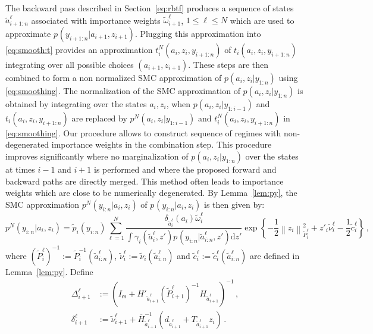 \documentclass[nolayout]{article}
\theoremstyle{plain}
\theoremstyle{definition}
\newcommand{\1}{\mathbbm{1}}
\def\rmd{\mathrm{d}}
\def\dimz{\mathsf{m}}
\def\barH{\overline{H}}
\def\eqsp{\,}
\newcommand{\normMat}[2]{\left\|#2\right\|_{#1}}
\newcommand{\eqdef}{\ensuremath{:=}}
\begin{document}
The backward pass described in Section~\ref{eq:rbtf} produces a sequence of states $\tilde{a}_{i+1:n}^{\ell}$ associated with importance weights $\tilde{\omega}_{i+1}^{\ell}$, $1\le \ell\le N$ which are used to approximate $p_{}(y_{i+1:n}|a_{i+1},z_{i+1})$. Plugging this approximation into \eqref{eq:smooth:t} provides an approximation $t^N_{i}(a_i,z_i,y_{i+1:n})$ of $t_{i}(a_i,z_i,y_{i+1:n})$ integrating over all possible choices $(a_{i+1},z_{i+1})$. These steps are then combined to form a non normalized SMC approximation of $p(a_{i},z_{i}|y_{1:n})$ using \eqref{eq:smoothing}. The normalization of the SMC approximation of $p(a_{i},z_{i}|y_{1:n})$ is obtained by integrating over the states $a_{i},z_{i}$, when $p(a_{i},z_{i}|y_{1:i-1})$ and $t_{i}(a_i,z_i,y_{i+1:n})$ are replaced by $p^N(a_{i},z_{i}|y_{1:i-1})$ and $t^N_{i}(a_i,z_i,y_{i+1:n})$ in \eqref{eq:smoothing}. 
Our procedure allows to construct sequence of regimes with non-degenerated importance weights in the combination step. This procedure improves significantly \cite{briers:doucet:maskell:2010} where no marginalization of $p(a_{i},z_{i}|y_{1:n})$ over the states at times $i-1$ and $i+1$ is performed and where the proposed forward and backward paths are directly merged. This method often leads to importance weights which are close to be numerically degenerated. By Lemma~\ref{lem:py}, the SMC approximation $p^{N}_{}(y_{i:n}|a_{i},z_{i})$ of $p_{}(y_{i:n}|a_{i},z_{i})$ is then given by:
\begin{equation}
\label{eq:pN:yi:n}
p^{N}_{}(y_{i:n}|a_{i},z_{i}) = \tilde{p}_i(y_{i:n}) \sum_{\ell=1}^N  \frac{\delta_{\tilde{a}^{\ell}_i}(a_i)\tilde{\omega}_{i}^{\ell}}{\int \gamma^{}_{i}(\tilde{a}^{\ell}_i,z')p_{}(y_{i:n}|\tilde{a}^{\ell}_{i:n},z')\rmd z'} \exp\left\{- \frac{1}{2}\normMat{\tilde{P}^{\ell}_{i}}{z_i}^2 + z'_i\tilde{\nu}^{\ell}_{i} - \frac{1}{2} \tilde{c}^{\ell}_i \right\}\eqsp,
\end{equation}
where $(\tilde{P}^{\ell}_{i})^{-1} \eqdef \tilde{P}_{i}^{-1}(\tilde{a}^{\ell}_{i:n})$, $\tilde{\nu}^{\ell}_{i}\eqdef \tilde{\nu}_{i}(\tilde{a}^{\ell}_{i:n})$ and $\tilde{c}^{\ell}_{i} \eqdef \tilde{c}^{\ell}_{i}(\tilde{a}^{\ell}_{i:n})$ are defined in Lemma~\ref{lem:py}. Define
\begin{align*}
\Delta^{\ell}_{i+1} &\eqdef \left(I_{\dimz} + H'_{\tilde{a}^\ell_{i+1}}(\tilde{P}^{\ell}_{i+1})^{-1}H_{\tilde{a}^\ell_{i+1}}\right)^{-1}\eqsp,\\
\delta^{\ell}_{i+1}&\eqdef\tilde{\nu}^{\ell}_{i+1} + \barH_{\tilde{a}^\ell_{i+1}}^{-1}(d_{\tilde{a}^\ell_{i+1}}+T_{\tilde{a}^\ell_{i+1}}z_i)\eqsp.
\end{align*}
\end{document}
